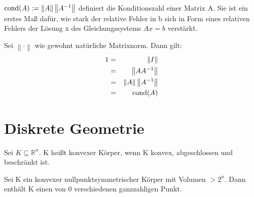 \documentclass[10pt]{scrbook}
\begin{document}
\begin{Def}
$\operatorname{cond}(A):=\left\|A\right\| \left\|A^{-1}\right\|$ definiert die Konditionszahl einer Matrix A. Sie ist ein erstes Maß dafür, wie stark der relative Fehler in b sich in Form eines relativen Fehlers der Lösung x des Gleichungssystems $A x=b$ verstärkt.

Sei $\left\|\cdot\right\|$ wie gewohnt natürliche Matrixnorm. Dann gilt:
\begin{eqnarray*}
1 & = & \left\|I\right\| \\
& = & \left\|A A^{-1}\right\| \\
& = & \left\|A\right\| \left\|A^{-1}\right\| \\
& = & \operatorname{cond}(A)
\end{eqnarray*}
\end{Def}

\chapter{Diskrete Geometrie}

\begin{Def}
Sei $K\subseteq \mathbb{R}^n$. K heißt konvexer Körper, wenn K konvex, abgeschlossen und beschränkt ist.
\end{Def}

\begin{Sa}
Sei K ein konvexer nullpunktsymmetrischer Körper mit Volumen $>2^n$. Dann enthält K einen von 0 verschiedenen ganzzahligen Punkt.
\end{Sa}
\end{document}

